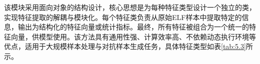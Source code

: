 
该模块采用面向对象的结构设计，核心思想是为每种特征类型设计一个独立的类，实现特征提取的解耦与模块化。每个特征类负责从原始ELF样本中提取特定的信息，输出为结构化的特征向量或统计指标。最终，所有特征被组合为一个统一的特征向量，供模型使用。该方法具有通用性强、计算效率高、不依赖动态执行环境等优点，适用于大规模样本处理与对抗样本生成任务，具体特征类型如表\ref{tab:5.3}所示。


